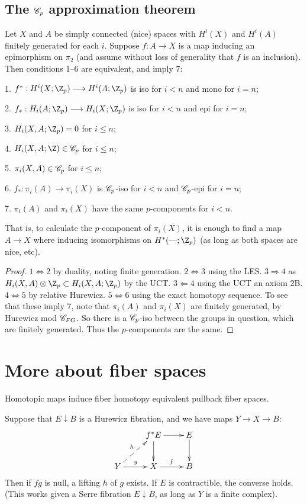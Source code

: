 \documentclass[11pt]{article}
\begin{document}
\setcounter{subsection}{5}
\subsection{The \texorpdfstring{$\mathscr{C}_p$}{Cp} approximation theorem}
Let $X$ and $A$ be simply connected (nice) spaces with $H^i(X)$ and $H^i(A)$ finitely generated for each $i$. Suppose $f:A\to X$ is a map inducing an epimorphism on $\pi_2$ (and assume without loss of generality that $f$ is an inclusion). Then conditions 1--6 are equivalent, and imply 7:
\begin{itemise}
\item[1.] $f^*:H^i(X;\Z_p)\to H^i(A;\Z_p)$ is iso for $i<n$ and mono for $i=n$;
\item[2.] $f_*:H_i(A;\Z_p)\to H_i(X;\Z_p)$ is iso for $i<n$ and epi for $i=n$;
\item[3.] $H_i(X,A;\Z_p)=0$ for $i\leq n$;
\item[4.] $H_i(X,A;\Z)\in\scrC_p$ for $i\leq n$;
\item[5.] $\pi_i(X,A)\in\mathscr{C}_p$ for $i\leq n$;
\item[6.] $f_*:\pi_i(A)\to \pi_i(X)$ is $\mathscr{C}_p$-iso for $i<n$ and $\mathscr{C}_p$-epi for $i=n$;
\item[7.] $\pi_i(A)$ and $\pi_i(X)$ have the same $p$-components for $i<n$.
\end{itemise}
That is, to calculate the $p$-component of $\pi_i(X)$, it is enough to find a map $A\to X$ where inducing isomorphisms on $H^*(\DASH;\Z_p)$ (as long as both spaces are nice, etc).
\begin{proof}
$1\Leftrightarrow 2$ by duality, noting finite generation. $2\Leftrightarrow 3$ using the LES. $3\Rightarrow 4$ as $H_i(X,A)\otimes\Z_p\subset H_i(X,A;\Z_p)$ by the UCT. $3\Leftarrow 4$ using the UCT an axiom 2B. $4\Leftrightarrow 5$ by relative Hurewicz. $5\Leftrightarrow 6$ using the exact homotopy sequence. To see that these imply 7, note that $\pi_i(A)$ and $\pi_i(X)$ are finitely generated, by Hurewicz mod $\mathscr{C}_{FG}$. So there is a $\mathscr{C}_p$-iso between the groups in question, which are finitely generated. Thus the $p$-components are the same.
\end{proof}

\section{More about fiber spaces}
Homotopic maps induce fiber homotopy equivalent pullback fiber spaces.
\begin{prop*}
Suppose that $E\downarrow B$ is a Hurewicz fibration, and we have maps $Y\to X\to B$:
\[\xymatrix{
&f^*E\ar[r]\ar[d]&E\ar[d]\\
Y\ar[r]^g\ar@{-->}[ur]^h&X\ar[r]^f&B
}\]
Then if $fg$ is null, a lifting $h$ of $g$ exists. If $E$ is contractible, the converse holds. (This works given a Serre fibration $E\downarrow B$, as long as $Y$ is a finite complex).
\end{prop*}
\end{document}
